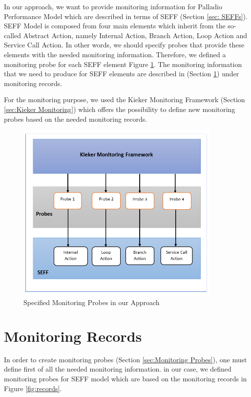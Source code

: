 In our approach, we want to provide monitoring information for Palladio Performance Model which are described in terms of SEFF (Section \ref{sec: SEFFs}).   SEFF Model is composed from four main elements which inherit from the so-called Abstract Action, namely Internal Action, Branch Action, Loop Action and Service Call Action. In other words, we should specify probes that provide these elements with the needed monitoring information. Therefore, we defined a monitoring probe for each SEFF element Figure \ref{fig:Specified Monitoring Probes in our Approach}. The monitoring information that we need to produce for SEFF elements are described in (Section \ref{sec:Monitoring Records}) under monitoring records.  

For the monitoring purpose, we used the Kieker Monitoring Framework (Section \ref{sec:Kieker Monitoring}) which offers the possibility to define new monitoring probes based on the needed monitoring records.

\begin{figure}[h]
\centering
\includegraphics[width=0.9\textwidth]{figures/probes}
\caption{Specified Monitoring Probes in our Approach}
\label{fig:Specified Monitoring Probes in our Approach}
\end{figure}

\section{Monitoring Records}
\label{sec:Monitoring Records}
In order to create monitoring probes (Section \ref{sec:Monitoring Probes}), one must define first of all the needed monitoring information. in our case, we defined monitoring probes for SEFF model which are based on the monitoring records in Figure \ref{fig:records}. 

